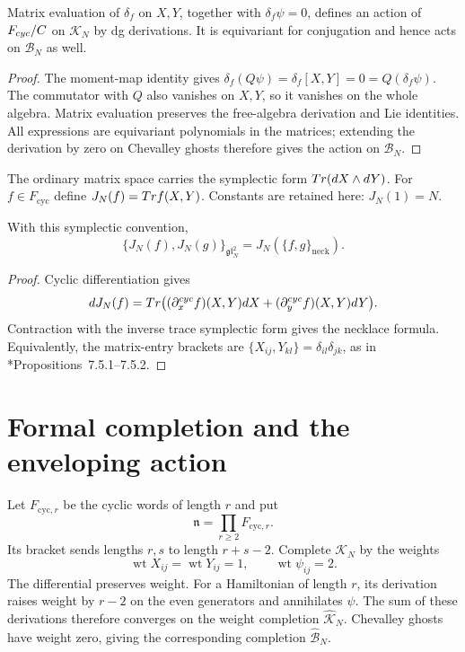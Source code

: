 \begin{proposition}
Matrix evaluation of $\delta_f$ on $X,Y$, together with
$\delta_f\psi=0$, defines an action of $F_{cyc}/C$
on $\mathcal K_N$ by dg derivations.
It is equivariant for conjugation and hence acts on
$\mathcal B_N$ as well.
\end{proposition}
\begin{proof}
The moment-map identity gives
$\delta_f(Q\psi)=\delta_f[X,Y]=0=Q(\delta_f\psi)$.
The commutator with $Q$ also vanishes on $X,Y$, so it vanishes on
the whole algebra.  Matrix evaluation preserves the free-algebra
derivation and Lie identities.
All expressions are equivariant polynomials in the matrices;
extending the derivation by zero on Chevalley ghosts therefore gives
the action on $\mathcal B_N$.
\end{proof}

The ordinary matrix space carries the symplectic form
$Tr(d X\wedge d Y)$.
For $f\in F_{\mathrm{cyc}}$ define $J_N(f)=Tr f(X,Y)$.
Constants are retained here: $J_N(1)=N$.

\begin{theorem}
With this symplectic convention,
\[
 \{J_N(f),J_N(g)\}_{\mathfrak{gl}_N^2}
 =J_N(\{f,g\}_{\mathrm{neck}}).
\]
\end{theorem}
\begin{proof}
Cyclic differentiation gives
\[
 d J_N(f)=Tr\bigl(
       (\partial_x^{cyc}f)(X,Y)d X
      +(\partial_y^{cyc}f)(X,Y)d Y\bigr).
\]
Contraction with the inverse trace symplectic form gives the necklace
formula.  Equivalently, the matrix-entry brackets are
$\{X_{ij},Y_{kl}\}=\delta_{il}\delta_{jk}$,
as in \cite{VanDenBerghDouble}*{Propositions~7.5.1--7.5.2}.
\end{proof}

\section{Formal completion and the enveloping action}
Let $F_{\mathrm{cyc},r}$ be the cyclic words of length $r$ and put
\[
 \mathfrak n=\prod_{r\ge2}F_{\mathrm{cyc},r}.
\]
Its bracket sends lengths $r,s$ to length $r+s-2$.
Complete $\mathcal K_N$ by the weights
\[
 \operatorname{wt}X_{ij}=\operatorname{wt}Y_{ij}=1,
 \qquad \operatorname{wt}\psi_{ij}=2.
\]
The differential preserves weight.
For a Hamiltonian of length $r$, its derivation raises weight by
$r-2$ on the even generators and annihilates $\psi$.
The sum of these derivations therefore converges on the weight
completion $\widehat{\mathcal K}_N$.
Chevalley ghosts have weight zero, giving the corresponding
completion $\widehat{\mathcal B}_N$.

